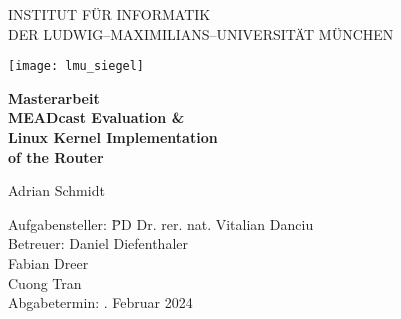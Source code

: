 \begin{center}

\vspace*{-2cm}

{\Huge INSTITUT FÜR INFORMATIK\\[1mm]}
DER LUDWIG--MAXIMILIANS--UNIVERSITÄT MÜNCHEN\\

\vspace*{1cm}

\texttt{[image: lmu\_siegel]}

\vspace*{2cm}

{\Large \textbf{Masterarbeit}}\\ %

\vspace{2.0cm}
    {\Huge \textbf{MEADcast Evaluation \&}}\\
\vspace*{3mm}
{\Huge \textbf{Linux Kernel Implementation}}\\
\vspace*{3mm}
{\Huge \textbf{of the Router}}\\

\vspace{1.5cm}

{\LARGE Adrian Schmidt} %
\vspace{2cm}

\parbox{1cm}{
\begin{large}
\begin{tabbing}
Aufgabensteller: \hspace{.5cm} \=PD Dr. rer. nat. Vitalian Danciu\\[2mm]
Betreuer:
\>Daniel Diefenthaler\\
\>Fabian Dreer\\ %
\>Cuong Tran\\[5mm]
Abgabetermin: . Februar 2024\\
\end{tabbing}
\end{large}}\\
\vspace{5mm}

\end{center}
